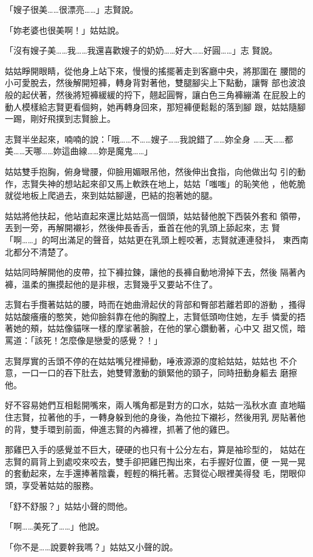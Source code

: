 「嫂子很美……很漂亮……」志賢說。

「妳老婆也很美啊！」姑姑說。

「沒有嫂子美……我……我還喜歡嫂子的奶奶……好大……好圓……」志
賢說。

姑姑睜開眼睛，從他身上站下來，慢慢的搖擺著走到客廳中央，將那圍在
腰間的小可愛脫去，然後解開短褲，轉身背對著他，雙腿腳尖上下點動，讓臀
部也波浪般的起伏著，然後將短褲緩緩的捋下，翹起圓臀，讓白色三角褲繃滿
在屁股上的動人模樣給志賢更看個夠，她再轉身回來，那短褲便鬆鬆的落到腳
跟，姑姑隨腳一踢，剛好飛撲到志賢臉上。

志賢半坐起來，喃喃的說：「哦……不……嫂子……我說錯了……妳全身
……天……都美……天哪……妳這曲線……妳是魔鬼……」

姑姑雙手抱胸，俯身彎腰，仰臉用媚眼吊他，然後伸出食指，向他做出勾
引的動作，志賢失神的想站起來卻又馬上軟跌在地上，姑姑「嗤嗤」的恥笑他
，他乾脆就從地板上爬過去，來到姑姑腳邊，巴結的抱著她的腿。

姑姑將他扶起，他站直起來還比姑姑高一個頭，姑姑替他脫下西裝外套和
領帶，丟到一旁，再解開襯衫，然後伸長香舌，垂首在他的乳頭上舔起來，志
賢「啊……」的呵出滿足的聲音，姑姑更在乳頭上輕咬著，志賢就連連發抖，
東西南北都分不清楚了。

姑姑同時解開他的皮帶，拉下褲拉鍊，讓他的長褲自動地滑掉下去，然後
隔著內褲，溫柔的撫摸起他的是非根，志賢幾乎又要站不住了。

志賢右手攬著姑姑的腰，時而在她曲滑起伏的背部和臀部若離若即的游動
，搔得姑姑酸癢癢的憨笑，她仰臉斜靠在他的胸膛上，志賢低頭吻住她，左手
憐愛的捂著她的頰，姑姑像貓咪一樣的摩挲著臉，在他的掌心鑽動著，心中又
甜又慌，暗罵道：「該死！怎麼像是戀愛的感覺？！」

志賢厚實的舌頭不停的在姑姑嘴兒裡掃動，唾液源源的度給姑姑，姑姑也
不介意，一口一口的吞下肚去，她雙臂激動的鎖緊他的頸子，同時扭動身軀去
磨擦他。

好不容易她們互相鬆開嘴來，兩人嘴角都是對方的口水，姑姑一泓秋水直
直地瞄住志賢，拉著他的手，一轉身躲到他的身後，為他拉下襯衫，然後用乳
房貼著他的背，雙手環到前面，伸進志賢的內褲裡，抓著了他的雞巴。

那雞巴入手的感覺並不巨大，硬硬的也只有十公分左右，算是袖珍型的，
姑姑在志賢的肩背上到處咬來咬去，雙手卻把雞巴掏出來，右手握好位置，便
一晃一晃的套動起來，左手還捧著陰囊，輕輕的稱托著。志賢從心眼裡美得發
毛，閉眼仰頭，享受著姑姑的服務。

「舒不舒服？」姑姑小聲的問他。

「啊……美死了……」他說。

「你不是……說要幹我嗎？」姑姑又小聲的說。

